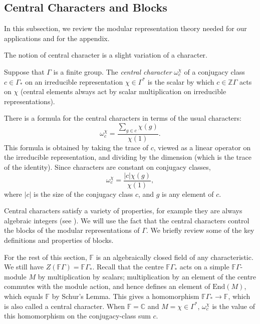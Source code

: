 \documentclass[ALCO,Unicode]{cedram}
\begin{document}
 

\subsection{Central Characters and Blocks} \label{mod_rep_thy_subsect}

In this subsection, we review the modular representation theory needed for our applications and for the appendix.

The notion of central character is a slight variation of a character.
\begin{definition}
Suppose that $\Gamma$ is a finite group. The \emph{central character} $\omega_c^\chi$ of a conjugacy class $c \in \Gamma_*$ on an irreducible representation $\chi \in \Gamma^*$ is the scalar by which $c \in \mathbb{Z}\Gamma$ acts on $\chi$ \textup{(}central elements always act by scalar multiplication on irreducible representations\textup{)}.
\end{definition}

There is a formula for the central characters in terms of the usual characters:
\[
\omega_c^\chi = \frac{\sum_{g \in c} \chi(g)}{\chi(1)}.
\]
This formula is obtained by taking the trace of $c$, viewed as a linear operator on the irreducible representation, and dividing by the dimension (which is the trace of the identity). Since characters are constant on conjugacy classes,
\[
\omega_c^\chi = \frac{|c|\chi(g)}{\chi(1)},
\]
where $|c|$ is the size of the conjugacy class $c$, and $g$ is any element of $c$.

Central characters satisfy a variety of properties, for example they are always algebraic integers (see \cite[Proposition 5.3.2]{EtingofEtAl}). We will use the fact that the central characters control the blocks of the modular representations of $\Gamma$. We briefly review some of the key definitions and properties of blocks.

For the rest of this section, $\mathbb{F}$ is an algebraically closed field of any characteristic. We still have $Z(\mathbb{F}\Gamma) = \mathbb{F}\Gamma_*$. Recall that the centre $\mathbb{F}\Gamma_*$ acts on a simple $\mathbb{F}\Gamma$-module $M$ by multiplication by scalars; multiplication by an element of the centre commutes with the module action, and hence defines an element of $\mathrm{End}(M)$, which equals $\mathbb{F}$ by Schur's Lemma. This gives a homomorphism $\mathbb{F}\Gamma_* \to \mathbb{F}$, which is also called a central character. When $\mathbb{F} = \mathbb{C}$ and $M = \chi \in \Gamma^*$, $\omega_c^\chi$ is the value of this homomorphism on the conjugacy-class sum $c$.
\end{document}
